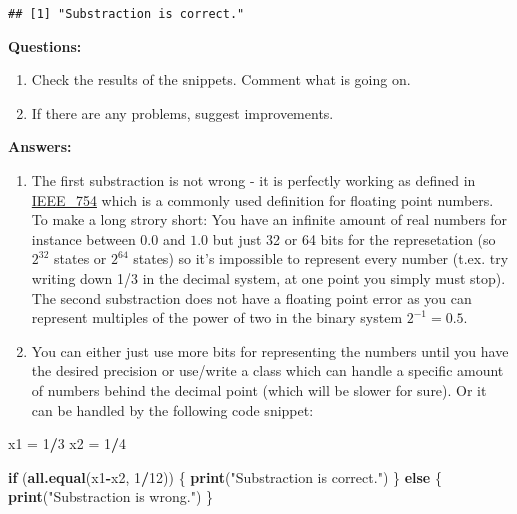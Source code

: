 \documentclass[]{article}
\newenvironment{Shaded}{\begin{snugshade}}{\end{snugshade}}
\newcommand{\KeywordTok}[1]{\textcolor[rgb]{0.13,0.29,0.53}{\textbf{#1}}}
\newcommand{\DecValTok}[1]{\textcolor[rgb]{0.00,0.00,0.81}{#1}}
\newcommand{\StringTok}[1]{\textcolor[rgb]{0.31,0.60,0.02}{#1}}
\newcommand{\ControlFlowTok}[1]{\textcolor[rgb]{0.13,0.29,0.53}{\textbf{#1}}}
\newcommand{\OperatorTok}[1]{\textcolor[rgb]{0.81,0.36,0.00}{\textbf{#1}}}
\newcommand{\NormalTok}[1]{#1}
\providecommand{\tightlist}{%
  \setlength{\itemsep}{0pt}\setlength{\parskip}{0pt}}
\begin{document}
\begin{verbatim}
## [1] "Substraction is correct."
\end{verbatim}

\textbf{Questions:}

\begin{enumerate}
\def\labelenumi{\arabic{enumi}.}
\tightlist
\item
  Check the results of the snippets. Comment what is going on.
\item
  If there are any problems, suggest improvements.
\end{enumerate}

\textbf{Answers:}

\begin{enumerate}
\def\labelenumi{\arabic{enumi}.}
\item
  The first substraction is not wrong - it is perfectly working as
  defined in \href{https://en.wikipedia.org/wiki/IEEE_754}{IEEE\_754}
  which is a commonly used definition for floating point numbers. To
  make a long strory short: You have an infinite amount of real numbers
  for instance between \(0.0\) and \(1.0\) but just 32 or 64 bits for
  the represetation (so \(2^{32}\) states or \(2^{64}\) states) so it's
  impossible to represent every number (t.ex. try writing down 1/3 in
  the decimal system, at one point you simply must stop). The second
  substraction does not have a floating point error as you can represent
  multiples of the power of two in the binary system \(2^{-1} = 0.5\).
\item
  You can either just use more bits for representing the numbers until
  you have the desired precision or use/write a class which can handle a
  specific amount of numbers behind the decimal point (which will be
  slower for sure). Or it can be handled by the following code snippet:
\end{enumerate}

\begin{Shaded}
\begin{Highlighting}[]
\NormalTok{x1 =}\StringTok{ }\DecValTok{1}\OperatorTok{/}\DecValTok{3}
\NormalTok{x2 =}\StringTok{ }\DecValTok{1}\OperatorTok{/}\DecValTok{4}

\ControlFlowTok{if}\NormalTok{ (}\KeywordTok{all.equal}\NormalTok{(x1}\OperatorTok{-}\NormalTok{x2, }\DecValTok{1}\OperatorTok{/}\DecValTok{12}\NormalTok{)) \{}
  \KeywordTok{print}\NormalTok{(}\StringTok{"Substraction is correct."}\NormalTok{)}
\NormalTok{\} }\ControlFlowTok{else}\NormalTok{ \{}
  \KeywordTok{print}\NormalTok{(}\StringTok{"Substraction is wrong."}\NormalTok{)}
\NormalTok{\}}
\end{Highlighting}
\end{Shaded}
\end{document}
